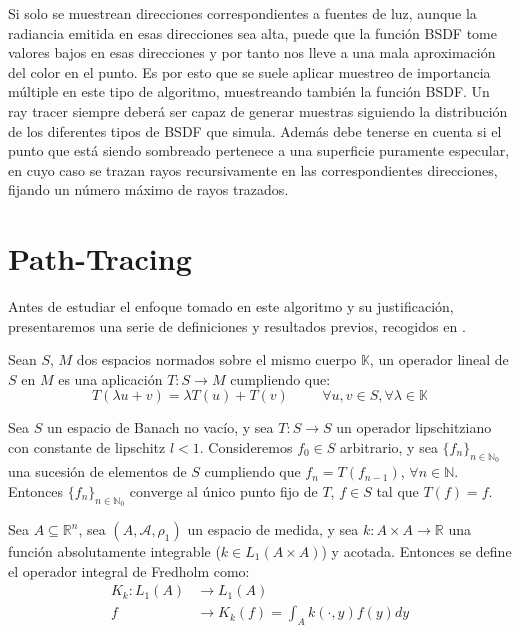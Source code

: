Si solo se muestrean direcciones correspondientes a fuentes de luz, aunque la radiancia emitida en esas direcciones sea alta, puede que la función BSDF tome valores bajos en esas direcciones y por tanto nos lleve a una mala aproximación del color en el punto. Es por esto que se suele aplicar muestreo de importancia múltiple en este tipo de algoritmo, muestreando también la función BSDF. Un ray tracer siempre deberá ser capaz de generar muestras siguiendo la distribución de los diferentes tipos de BSDF que simula. Además debe tenerse en cuenta si el punto que está siendo sombreado pertenece a una superficie puramente especular, en cuyo caso se trazan rayos recursivamente en las correspondientes direcciones, fijando un número máximo de rayos trazados.

\section{Path-Tracing}
Antes de estudiar el enfoque tomado en este algoritmo y su justificación, presentaremos una serie de definiciones y resultados previos, recogidos en \cite{Fredholm}.

\begin{definicion}
  Sean $S$, $M$ dos espacios normados sobre el mismo cuerpo $\mathds{K}$, un operador lineal de $S$ en $M$ es una aplicación $T:S\rightarrow M$ cumpliendo que:
  $$T(\lambda u + v) = \lambda T(u) + T(v)\hspace{1cm} \forall u,v\in S, \forall \lambda\in\mathds{K} $$
\end{definicion}

\begin{teorema}
Sea $S$ un espacio de Banach no vacío, y sea $T:S\rightarrow S$ un operador lipschitziano con constante de lipschitz $l<1$. Consideremos $f_0\in S$ arbitrario, y sea $\{f_n\}_{n\in\mathds{N}_0}$ una sucesión de elementos de $S$ cumpliendo que $f_n = T(f_{n-1})$, $\forall n\in\mathds{N}$. Entonces $\{f_n\}_{n\in\mathds{N}_0}$ converge al único punto fijo de $T$, $f\in S$ tal que $T(f)=f$.
\end{teorema}

\begin{definicion}
  Sea $A\subseteq \mathds{R}^n$, sea $(A, \mathcal{A}, \rho_1)$ un espacio de medida, y sea $k:A\times A\rightarrow \mathds{R}$ una función absolutamente integrable ($k\in L_1(A\times A)$) y acotada. Entonces se define el operador integral de Fredholm como:
  \begin{align*}
    K_k:L_1(A)&\rightarrow L_1(A)\\
    f&\rightarrow K_k(f) = \int_A k(\cdot,y) f(y) dy
  \end{align*}  
\end{definicion}

